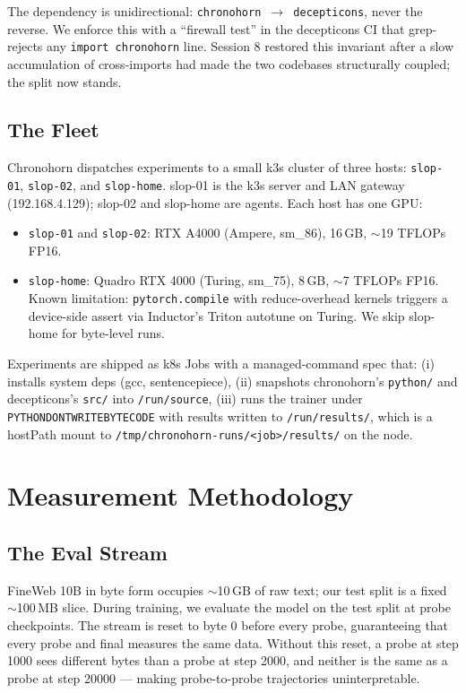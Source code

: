\documentclass[11pt,openany]{book}
\theoremstyle{definition}
\theoremstyle{plain}
\begin{document}
The dependency is unidirectional: \texttt{chronohorn $\to$ decepticons},
never the reverse. We enforce this with a ``firewall test'' in the
decepticons CI that grep-rejects any \texttt{import chronohorn} line.
Session 8 restored this invariant after a slow accumulation of cross-imports
had made the two codebases structurally coupled; the split now stands.

\section{The Fleet}

Chronohorn dispatches experiments to a small k3s cluster of three hosts:
\texttt{slop-01}, \texttt{slop-02}, and \texttt{slop-home}. slop-01 is the
k3s server and LAN gateway (192.168.4.129); slop-02 and slop-home are
agents. Each host has one GPU:
\begin{itemize}
  \item \texttt{slop-01} and \texttt{slop-02}: RTX A4000 (Ampere, sm\_86),
    16\,GB, $\sim$19 TFLOPs FP16.
  \item \texttt{slop-home}: Quadro RTX 4000 (Turing, sm\_75), 8\,GB,
    $\sim$7 TFLOPs FP16. Known limitation: \texttt{pytorch.compile} with
    reduce-overhead kernels triggers a device-side assert via Inductor's
    Triton autotune on Turing. We skip slop-home for byte-level runs.
\end{itemize}

Experiments are shipped as k8s Jobs with a managed-command spec that:
(i) installs system deps (gcc, sentencepiece), (ii) snapshots chronohorn's
\texttt{python/} and decepticons's \texttt{src/} into \texttt{/run/source},
(iii) runs the trainer under \texttt{PYTHONDONTWRITEBYTECODE} with results
written to \texttt{/run/results/}, which is a hostPath mount to
\texttt{/tmp/chronohorn-runs/<job>/results/} on the node.

\chapter{Measurement Methodology}
\label{ch:methodology}

\section{The Eval Stream}

FineWeb 10B in byte form occupies $\sim$10\,GB of raw text; our test split
is a fixed $\sim$100\,MB slice. During training, we evaluate the model on
the test split at probe checkpoints. The stream is reset to byte 0 before
every probe, guaranteeing that every probe and final measures the same
data. Without this reset, a probe at step 1000 sees different bytes than a
probe at step 2000, and neither is the same as a probe at step 20000 ---
making probe-to-probe trajectories uninterpretable.
\end{document}
